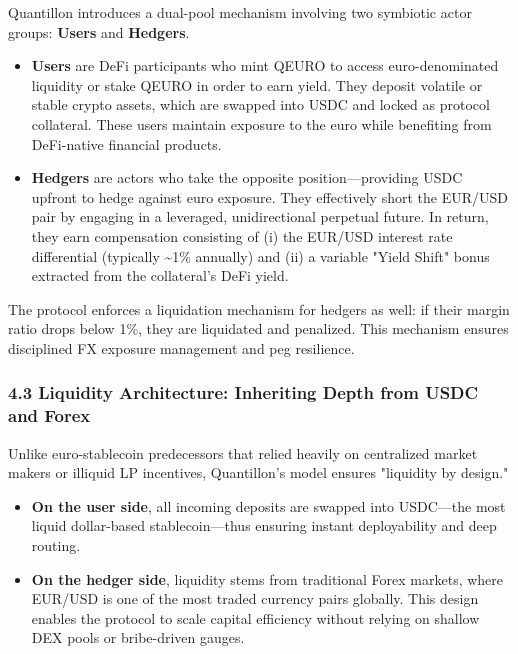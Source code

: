Quantillon introduces a dual-pool mechanism involving two symbiotic
actor groups: \textbf{Users} and \textbf{Hedgers}.

\begin{itemize}
\item
  \textbf{Users} are DeFi participants who mint QEURO to access
  euro-denominated liquidity or stake QEURO in order to earn yield. They
  deposit volatile or stable crypto assets, which are swapped into USDC
  and locked as protocol collateral. These users maintain exposure to
  the euro while benefiting from DeFi-native financial products.
\item
  \textbf{Hedgers} are actors who take the opposite position---providing
  USDC upfront to hedge against euro exposure. They effectively short
  the EUR/USD pair by engaging in a leveraged, unidirectional perpetual
  future. In return, they earn compensation consisting of (i) the
  EUR/USD interest rate differential (typically \textasciitilde1\%
  annually) and (ii) a variable "Yield Shift" bonus extracted from the
  collateral's DeFi yield.
\end{itemize}

The protocol enforces a liquidation mechanism for hedgers as well: if
their margin ratio drops below 1\%, they are liquidated and penalized.
This mechanism ensures disciplined FX exposure management and peg
resilience.

\hypertarget{liquidity-architecture-inheriting-depth-from-usdc-and-forex}{%
\subsubsection{4.3 Liquidity Architecture: Inheriting Depth from USDC
and
Forex}\label{liquidity-architecture-inheriting-depth-from-usdc-and-forex}}

Unlike euro-stablecoin predecessors that relied heavily on centralized
market makers or illiquid LP incentives, Quantillon's model ensures
"liquidity by design."

\begin{itemize}
\item
  \textbf{On the user side}, all incoming deposits are swapped into
  USDC---the most liquid dollar-based stablecoin---thus ensuring instant
  deployability and deep routing.
\item
  \textbf{On the hedger side}, liquidity stems from traditional Forex
  markets, where EUR/USD is one of the most traded currency pairs
  globally. This design enables the protocol to scale capital efficiency
  without relying on shallow DEX pools or bribe-driven gauges.
\end{itemize}


